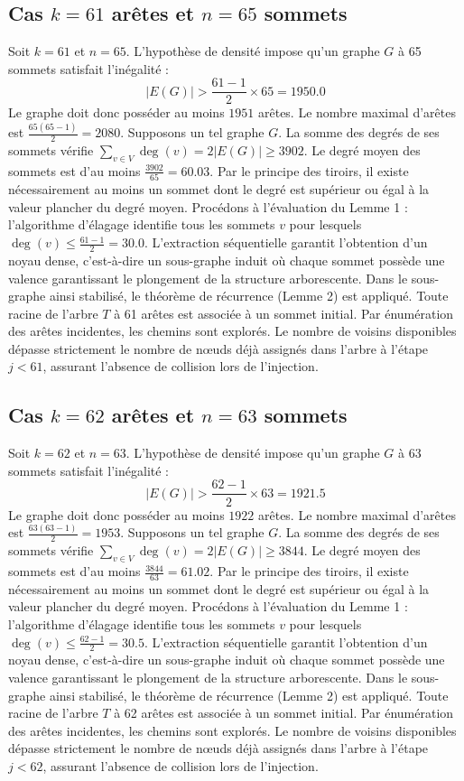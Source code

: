 \documentclass[12pt,a4paper]{article}
\begin{document}
\subsection{Cas $k = 61$ arêtes et $n = 65$ sommets}
Soit $k = 61$ et $n = 65$. L'hypothèse de densité impose qu'un graphe $G$ à 65 sommets satisfait l'inégalité :
$$ |E(G)| > \frac{61-1}{2} \times 65 = 1950.0 $$
Le graphe doit donc posséder au moins $1951$ arêtes. Le nombre maximal d'arêtes est $\frac{65(65-1)}{2} = 2080$.
Supposons un tel graphe $G$. La somme des degrés de ses sommets vérifie $\sum_{v \in V} \deg(v) = 2|E(G)| \geq 3902$.
Le degré moyen des sommets est d'au moins $\frac{3902}{65} = 60.03$.
Par le principe des tiroirs, il existe nécessairement au moins un sommet dont le degré est supérieur ou égal à la valeur plancher du degré moyen.
Procédons à l'évaluation du Lemme 1 : l'algorithme d'élagage identifie tous les sommets $v$ pour lesquels $\deg(v) \leq \frac{61-1}{2} = 30.0$.
L'extraction séquentielle garantit l'obtention d'un noyau dense, c'est-à-dire un sous-graphe induit où chaque sommet possède une valence garantissant le plongement de la structure arborescente.
Dans le sous-graphe ainsi stabilisé, le théorème de récurrence (Lemme 2) est appliqué. Toute racine de l'arbre $T$ à 61 arêtes est associée à un sommet initial. Par énumération des arêtes incidentes, les chemins sont explorés. Le nombre de voisins disponibles dépasse strictement le nombre de nœuds déjà assignés dans l'arbre à l'étape $j < 61$, assurant l'absence de collision lors de l'injection.

\subsection{Cas $k = 62$ arêtes et $n = 63$ sommets}
Soit $k = 62$ et $n = 63$. L'hypothèse de densité impose qu'un graphe $G$ à 63 sommets satisfait l'inégalité :
$$ |E(G)| > \frac{62-1}{2} \times 63 = 1921.5 $$
Le graphe doit donc posséder au moins $1922$ arêtes. Le nombre maximal d'arêtes est $\frac{63(63-1)}{2} = 1953$.
Supposons un tel graphe $G$. La somme des degrés de ses sommets vérifie $\sum_{v \in V} \deg(v) = 2|E(G)| \geq 3844$.
Le degré moyen des sommets est d'au moins $\frac{3844}{63} = 61.02$.
Par le principe des tiroirs, il existe nécessairement au moins un sommet dont le degré est supérieur ou égal à la valeur plancher du degré moyen.
Procédons à l'évaluation du Lemme 1 : l'algorithme d'élagage identifie tous les sommets $v$ pour lesquels $\deg(v) \leq \frac{62-1}{2} = 30.5$.
L'extraction séquentielle garantit l'obtention d'un noyau dense, c'est-à-dire un sous-graphe induit où chaque sommet possède une valence garantissant le plongement de la structure arborescente.
Dans le sous-graphe ainsi stabilisé, le théorème de récurrence (Lemme 2) est appliqué. Toute racine de l'arbre $T$ à 62 arêtes est associée à un sommet initial. Par énumération des arêtes incidentes, les chemins sont explorés. Le nombre de voisins disponibles dépasse strictement le nombre de nœuds déjà assignés dans l'arbre à l'étape $j < 62$, assurant l'absence de collision lors de l'injection.
\end{document}
